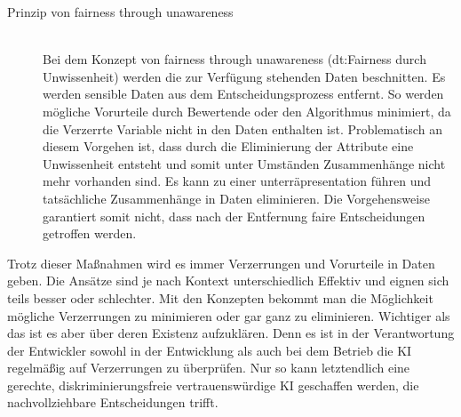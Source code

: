 \begin{onehalfspace}
\begin{description}
\begin{description}
                \item[Prinzip von \glqq{}fairness through unawareness\grqq{}] \hfill \\
                Bei dem Konzept von \glqq{}fairness through unawareness\grqq{} (\ac*{dt}:Fairness durch Unwissenheit) werden die zur Verfügung stehenden Daten beschnitten. Es werden sensible Daten aus dem Entscheidungsprozess entfernt. So werden mögliche Vorurteile durch Bewertende oder den Algorithmus minimiert, da die Verzerrte Variable nicht in den Daten enthalten ist. Problematisch an diesem Vorgehen ist, dass durch die Eliminierung der Attribute eine Unwissenheit entsteht und somit unter Umständen Zusammenhänge nicht mehr vorhanden sind. Es kann zu einer unterräpresentation führen und tatsächliche Zusammenhänge in Daten eliminieren. Die Vorgehensweise garantiert somit nicht, dass nach der Entfernung faire Entscheidungen getroffen werden.\cite{hagendorff2019maschinelles}

            \end{description}
            
        \end{description}
        Trotz dieser Maßnahmen wird es immer Verzerrungen und Vorurteile in Daten geben. Die Ansätze sind je nach Kontext unterschiedlich Effektiv und eignen sich teils besser oder schlechter. Mit den Konzepten bekommt man die Möglichkeit mögliche Verzerrungen zu minimieren oder gar ganz zu eliminieren. Wichtiger als das ist es aber über deren Existenz aufzuklären. Denn es ist in der Verantwortung der Entwickler sowohl in der Entwicklung als auch bei dem Betrieb die \ac*{KI} regelmäßig auf Verzerrungen zu überprüfen.\cite{Drew2019} Nur so kann letztendlich eine gerechte, diskriminierungsfreie vertrauenswürdige \ac*{KI} geschaffen werden, die nachvollziehbare Entscheidungen trifft.\cite{HEGKI2019}\cite{HEGKI2019Definition}\cite{Fabi2020}
        
    \newpage
\end{onehalfspace}